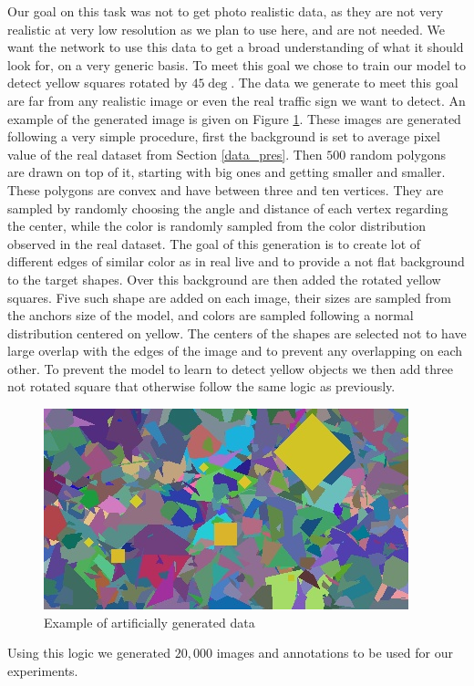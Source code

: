 Our goal on this task was not to get photo realistic data, as they are not very realistic at very low resolution as we plan to use here, and are not needed. We want the network to use this data to get a broad understanding of what it should look for, on a very generic basis. To meet this goal we chose to train our model to detect yellow squares rotated by $45\deg$. The data we generate to meet this goal are far from any realistic image or even the real traffic sign we want to detect. An example of the generated image is given on Figure \ref{fig:fake_im_ex}. These images are generated following a very simple procedure, first the background is set to average pixel value of the real dataset from Section \ref{data_pres}. Then $500$ random polygons are drawn on top of it, starting with big ones and getting smaller and smaller. These polygons are convex and have between three and ten vertices. They are sampled by randomly choosing the angle and distance of each vertex regarding the center, while the color is randomly sampled from the color distribution observed in the real dataset. The goal of this generation is to create lot of different edges of similar color as in real live and to provide a not flat background to the target shapes. Over this background are then added the rotated yellow squares. Five such shape are added on each image, their sizes are sampled from the anchors size of the model, and colors are sampled following a normal distribution centered on yellow. The centers of the shapes are selected not to have large overlap with the edges of the image and to prevent any overlapping on each other. To prevent the model to learn to detect yellow objects we then add three not rotated square that otherwise follow the same logic as previously.

\begin{figure}
    \centering
    \includegraphics[width=0.5\linewidth]{figures/fake_data_ex.jpg}
    \caption{Example of artificially generated data}
    \label{fig:fake_im_ex}
\end{figure}{}

Using this logic we generated $20,000$ images and annotations to be used for our experiments.

